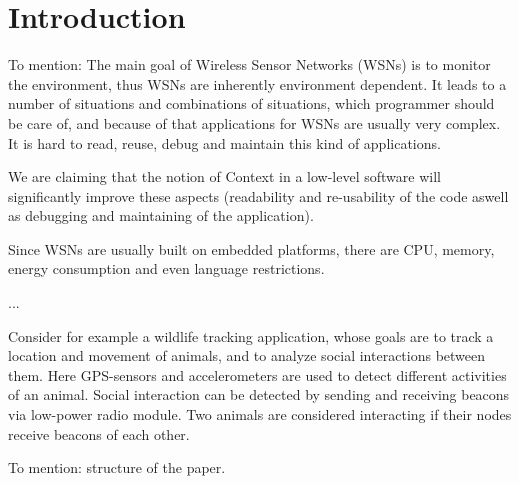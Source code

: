 \section{Introduction} To mention: The main goal of Wireless Sensor Networks
(WSNs) is to monitor the environment, thus WSNs are inherently environment
dependent. It leads to a number of situations and combinations of situations,
which programmer should be care of, and because of that applications for WSNs
are usually very complex. It is hard to read, reuse, debug and maintain this
kind of applications.

We are claiming that the notion of Context in a low-level software will
significantly improve these aspects (readability and re-usability of the code
aswell as debugging and maintaining of the application).

Since WSNs are usually built on embedded platforms, there are CPU, memory,
energy consumption and even language restrictions.

...

Consider for example a wildlife tracking application\cite{pasztor10}, whose
goals are to track a location and movement of animals, and to analyze social
interactions between them. Here GPS-sensors and accelerometers are used to detect
different activities of an animal. Social interaction can be detected by
sending and receiving beacons via low-power radio module. Two animals are
considered interacting if their nodes receive beacons of each other.

To mention: structure of the paper.